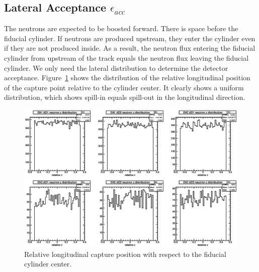 \subsection{Lateral Acceptance \texorpdfstring{$\epsilon_{acc}$}{epsilon}}
The neutrons are expected to be boosted forward. There is space before the fiducial cylinder. If neutrons are produced upstream, they enter the cylinder even if they are not produced inside. As a result, the neutron flux entering the fiducial cylinder from upstream of the track equals the neutron flux leaving the fiducial cylinder. We only need the lateral distribution to determine the detector acceptance. Figure~\ref{fig:z_distribution} shows the distribution of the relative longitudinal position of the capture point relative to the cylinder center. It clearly shows a uniform distribution, which shows spill-in equals spill-out in the longitudinal direction.
\begin{figure}[ht]
	\centering
	\includegraphics[width=\textwidth]{figures/chap7/z_distribution.eps}
	\caption{Relative longitudinal capture position with respect to the fiducial cylinder center.}
	\label{fig:z_distribution}
\end{figure}

